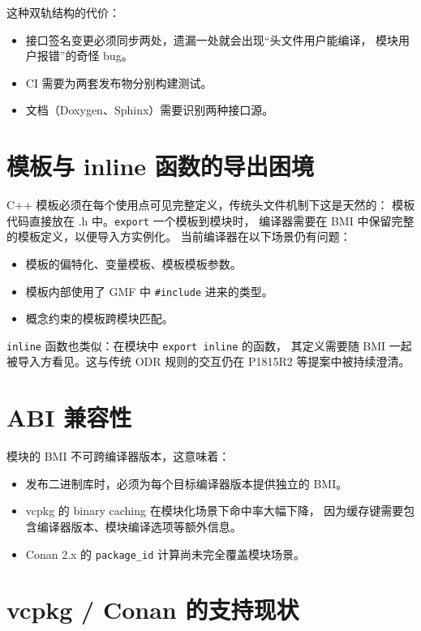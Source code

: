 \documentclass[12pt,a4paper,fontset=fandol]{ctexbook}
\newcommand{\flag}[1]{\texttt{#1}}
\begin{document}
这种双轨结构的代价：

\begin{itemize}
  \item 接口签名变更必须同步两处，遗漏一处就会出现“头文件用户能编译，
        模块用户报错”的奇怪 bug。
  \item CI 需要为两套发布物分别构建测试。
  \item 文档（Doxygen、Sphinx）需要识别两种接口源。
\end{itemize}

\section{模板与 inline 函数的导出困境}

C++ 模板必须在每个使用点可见完整定义，传统头文件机制下这是天然的：
模板代码直接放在 .h 中。\flag{export} 一个模板到模块时，
编译器需要在 BMI 中保留完整的模板定义，以便导入方实例化。
当前编译器在以下场景仍有问题：

\begin{itemize}
  \item 模板的偏特化、变量模板、模板模板参数。
  \item 模板内部使用了 GMF 中 \flag{\#include} 进来的类型。
  \item 概念约束的模板跨模块匹配。
\end{itemize}

\texttt{inline} 函数也类似：在模块中 \flag{export inline} 的函数，
其定义需要随 BMI 一起被导入方看见。这与传统 ODR 规则的交互仍在
P1815R2 等提案中被持续澄清。

\section{ABI 兼容性}

模块的 BMI 不可跨编译器版本，这意味着：

\begin{itemize}
  \item 发布二进制库时，必须为每个目标编译器版本提供独立的 BMI。
  \item vcpkg 的 binary caching 在模块化场景下命中率大幅下降，
        因为缓存键需要包含编译器版本、模块编译选项等额外信息。
  \item Conan 2.x 的 \texttt{package\_id} 计算尚未完全覆盖模块场景。
\end{itemize}

\section{vcpkg / Conan 的支持现状}
\end{document}
